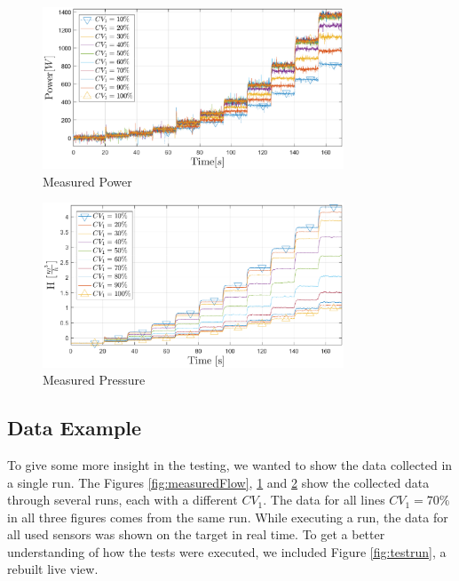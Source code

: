 \begin{figure}[H]
	\centering
	\includegraphics[width=0.8\textwidth]{figures/05mathematicalModelling/measuredPower.eps}
	\caption{Measured Power}
	\label{fig:measuredPower}
\end{figure}

\begin{figure}[H]
	\centering
	\includegraphics[width=0.8\textwidth]{figures/05mathematicalModelling/measuredPressure.eps}
	\caption{Measured Pressure}
	\label{fig:measuredPressure}
\end{figure}

\subsection{Data Example}%
To give some more insight in the testing,
we wanted to show the data collected in a single run.
The Figures \ref{fig:measuredFlow}, \ref{fig:measuredPower} and \ref{fig:measuredPressure}
show the collected data through several runs,
each with a different $CV_1$.
The data for all lines $CV_1 = 70\%$ in all three figures comes from the same run.
While executing a run,
the data for all used sensors was shown on the target in real time.
To get a better understanding of how the tests were executed,
we included Figure \ref{fig:testrun},
a rebuilt live view.

